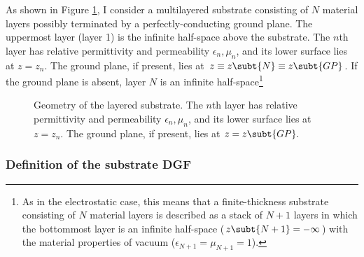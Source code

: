 \documentclass[letterpaper]{article}
\begin{document}
As shown in Figure \ref{SubstrateGeometryFigure}, I consider
a multilayered substrate consisting of $N$ material layers
possibly terminated by a perfectly-conducting ground plane.
The uppermost layer (layer 1) is the infinite half-space
above the substrate.
The $n$th layer
has relative permittivity and permeability $\epsilon_n,\mu_n$,
and its lower surface lies at $z=z_n$.
The ground plane, if present,
lies at $z\equiv z\subt{N}\equiv z\subt{GP}$.
If the ground plane is absent, layer $N$ is an
infinite half-space\footnote{As in the electrostatic case,
this means that a finite-thickness substrate consisting of
$N$ material layers is described as a stack of $N+1$ layers
in which the bottommost layer is an infinite half-space
($z\subt{N+1}=-\infty$) with the material properties of vacuum
($\epsilon_{N+1}=\mu_{N+1}=1$).}
\begin{figure}[!]
\begin{center}
\caption{Geometry of the layered substrate.
The $n$th layer 
has relative permittivity and permeability $\epsilon_n,\mu_n$,
and its lower surface lies at $z=z_n$. The ground plane, if present,
lies at $z=z\subt{GP}.$
}
\label{SubstrateGeometryFigure}
\end{center}
\end{figure}

\subsubsection*{Definition of the substrate DGF}
\end{document}
